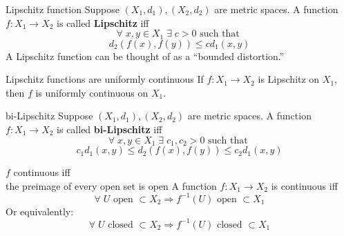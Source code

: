 \documentclass[avery5371,grid]{flashcards}
\newcommand{\st}{\textrm{ such that }}
\begin{document}
\begin{flashcard}[Definition]{Lipschitz function}
Suppose $(X_1,d_1), (X_2, d_2)$ are metric spaces.  A function
$f:X_1 \rightarrow X_2$ is called \mbox{\textbf{Lipschitz}} iff
\begin{equation*}
\forall \; x,y \in X_1 \; \exists \; c>0 \st
\end{equation*}
\begin{equation*}
d_2(f(x),f(y)) \leq c d_1(x,y)
\end{equation*}
A Lipschitz function can be thought of as a ``bounded distortion.''
\end{flashcard}

\begin{flashcard}[Theorem]{Lipschitz functions are uniformly continuous}
If $f:X_1 \rightarrow X_2$ is Lipschitz on $X_1$, then $f$ is uniformly
continuous on $X_1$.
\end{flashcard}

\begin{flashcard}[Definition]{bi-Lipschitz}
Suppose $(X_1,d_1), (X_2, d_2)$ are metric spaces.  A function
$f:X_1 \rightarrow X_2$ is called \mbox{\textbf{bi-Lipschitz}} iff
\begin{equation*}
\forall \; x,y \in X_1 \; \exists \; c_1,c_2>0 \st
\end{equation*}
\begin{equation*}
c_1 d_1(x,y) \leq d_2(f(x),f(y)) \leq c_2 d_1(x,y)
\end{equation*}
\end{flashcard}

\begin{flashcard}[Theorem]{$f$ continuous iff \\
the preimage of every open set is open}
A function $f:X_1 \rightarrow X_2$ is continuous iff 
\begin{equation*}
\forall \; U \mbox{ open }\subset X_2 \Rightarrow
f^{-1}(U) \mbox{ open }\subset X_1
\end{equation*}
Or equivalently:
\begin{equation*}
\forall \; U \mbox{ closed }\subset X_2 \Rightarrow
f^{-1}(U) \mbox{ closed }\subset X_1
\end{equation*}
\end{flashcard}
\end{document}
